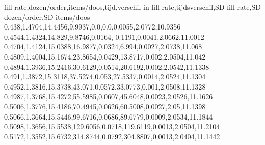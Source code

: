 fill rate,dozen/order,items/doos,tijd,verschil in fill rate,tijdsverschil,SD fill rate,SD dozen/order,SD items/doos
0.438,1.4704,14.4456,9.9937,0.0,0.0,0.0055,2.0772,10.9356
0.4544,1.4324,14.829,9.8746,0.0164,-0.1191,0.0041,2.0662,11.0012
0.4704,1.4124,15.0388,16.9877,0.0324,6.994,0.0027,2.0738,11.068
0.4809,1.4004,15.1674,23.8654,0.0429,13.8717,0.002,2.0504,11.042
0.4894,1.3936,15.2416,30.6129,0.0514,20.6192,0.002,2.0542,11.1338
0.491,1.3872,15.3118,37.5274,0.053,27.5337,0.0014,2.0524,11.1304
0.4952,1.3816,15.3738,43.071,0.0572,33.0773,0.001,2.0508,11.1328
0.4987,1.3768,15.4272,55.5985,0.0607,45.6048,0.0023,2.0526,11.1626
0.5006,1.3776,15.4186,70.4945,0.0626,60.5008,0.0027,2.05,11.1398
0.5066,1.3664,15.5446,99.6716,0.0686,89.6779,0.0009,2.0534,11.1844
0.5098,1.3656,15.5538,129.6056,0.0718,119.6119,0.0013,2.0504,11.2104
0.5172,1.3552,15.6732,314.8744,0.0792,304.8807,0.0013,2.0404,11.1442
